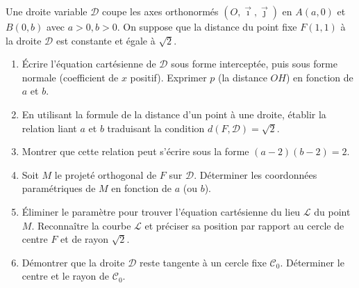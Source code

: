 \documentclass[11pt]{article}
\begin{document}
\begin{exercice}
Une droite variable $\mathcal{D}$ coupe les axes orthonormés $(O, \vec{\imath}, \vec{\jmath})$ en $A(a, 0)$ et $B(0, b)$ avec $a > 0, b > 0$. On suppose que la distance du point fixe $F(1, 1)$ à la droite $\mathcal{D}$ est constante et égale à $\sqrt{2}$.
\begin{enumerate}
    \item Écrire l'équation cartésienne de $\mathcal{D}$ sous forme interceptée, puis sous forme normale (coefficient de $x$ positif). Exprimer $p$ (la distance $OH$) en fonction de $a$ et $b$.
    \item En utilisant la formule de la distance d'un point à une droite, établir la relation liant $a$ et $b$ traduisant la condition $d(F, \mathcal{D}) = \sqrt{2}$.
    \item Montrer que cette relation peut s'écrire sous la forme $(a-2)(b-2) = 2$.
    \item Soit $M$ le projeté orthogonal de $F$ sur $\mathcal{D}$. Déterminer les coordonnées paramétriques de $M$ en fonction de $a$ (ou $b$).
    \item Éliminer le paramètre pour trouver l'équation cartésienne du lieu $\mathcal{L}$ du point $M$. Reconnaître la courbe $\mathcal{L}$ et préciser sa position par rapport au cercle de centre $F$ et de rayon $\sqrt{2}$.
    \item Démontrer que la droite $\mathcal{D}$ reste tangente à un cercle fixe $\mathcal{C}_0$. Déterminer le centre et le rayon de $\mathcal{C}_0$.
\end{enumerate}
\end{exercice}
\end{document}
